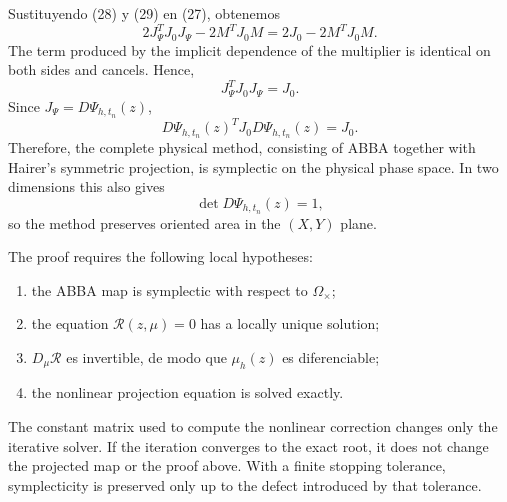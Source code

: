\documentclass[11pt,a4paper]{article}
\newcommand{\Om}{\Omega_{\times}}
\begin{document}
Sustituyendo (28) y (29) en (27), obtenemos
\[
 2J_\Psi^TJ_0J_\Psi-2M^TJ_0M
 =2J_0-2M^TJ_0M. \tag{30}
\]
The term produced by the implicit dependence of the multiplier is identical on both sides
and cancels. Hence,
\[
 \boxed{J_\Psi^TJ_0J_\Psi=J_0.} \tag{31}
\]
Since $J_\Psi=D\Psi_{h,t_n}(z)$,
\[
 \boxed{
 D\Psi_{h,t_n}(z)^T J_0D\Psi_{h,t_n}(z)=J_0.
 } \tag{32}
\]
Therefore, the complete physical method, consisting of ABBA together with Hairer's
symmetric projection, is symplectic on the physical phase space. In two dimensions this also gives
\[
 \det D\Psi_{h,t_n}(z)=1,
\]
so the method preserves oriented area in the $(X,Y)$ plane.

The proof requires the following local hypotheses:
\begin{enumerate}
 \item the ABBA map is symplectic with respect to $\Om$;
 \item the equation $\mathcal R(z,\mu)=0$ has a locally unique solution;
 \item $D_\mu\mathcal R$ es invertible, de modo que $\mu_h(z)$ es diferenciable;
 \item the nonlinear projection equation is solved exactly.
\end{enumerate}
The constant matrix used to compute the nonlinear correction changes only the iterative
solver. If the iteration converges to the exact root, it does not change the projected map
or the proof above. With a finite stopping tolerance, symplecticity is preserved only up
to the defect introduced by that tolerance.
\end{document}
